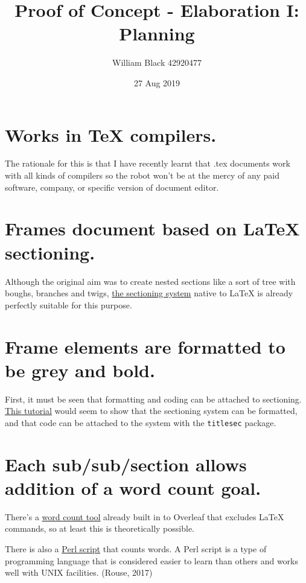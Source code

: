 \documentclass[12pt]{article}
\title{\textbf{Proof of Concept - Elaboration I: Planning}}
\date{27 Aug 2019}
\author{William Black 42920477}
\begin{document}

\section{\large Works in TeX compilers.}

The rationale for this is that I have recently learnt that .tex documents work with all kinds of compilers so the robot won't be at the mercy of any paid software, company, or specific version of document editor.

\section{\large Frames document based on LaTeX sectioning.}

Although the original aim was to create nested sections like a sort of tree with boughs, branches and twigs, \href{https://www.overleaf.com/learn/latex/Sections_and_chapters#Document_Sectioning}{the sectioning system} native to LaTeX is already perfectly suitable for this purpose.

\section{\large Frame elements are formatted to be grey and bold.}

First, it must be seen that formatting and coding can be attached to sectioning. \href{https://www.overleaf.com/learn/latex/Sections_and_chapters#Customize_chapters_and_sections}{This tutorial} would seem to show that the sectioning system can be formatted, and that code can be attached to the system with the \texttt{titlesec} package.

\section{\large Each sub/sub/section allows addition of a word count goal.}

There's a \href{https://www.overleaf.com/learn/how-to/Is_there_a_way_to_run_a_word_count_that_doesn\%27t_include_LaTeX_commands\%3F}{word count tool} already built in to Overleaf that excludes LaTeX commands, so at least this is theoretically possible.

There is also a \href{https://app.uio.no/ifi/texcount/}{Perl script} that counts words. A Perl script is a type of programming language that is considered easier to learn than others and works well with UNIX facilities. (Rouse, 2017)
\end{document}
